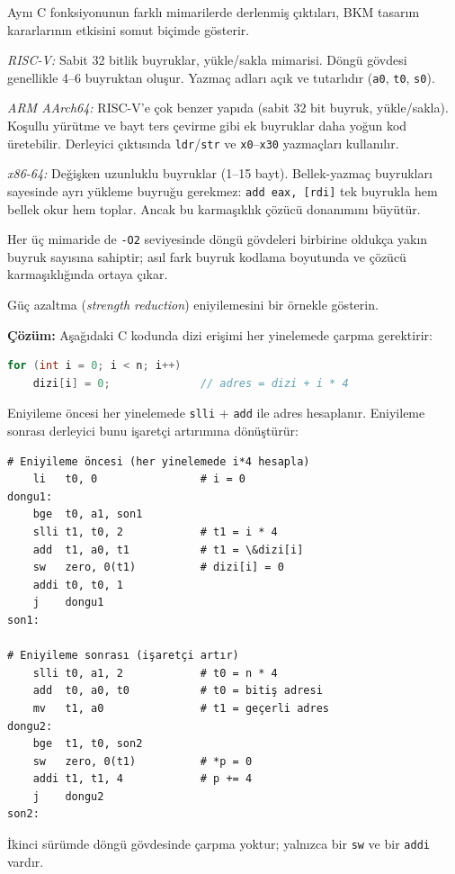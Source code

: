 \begin{karsilastirma}
Aynı C fonksiyonunun farklı mimarilerde derlenmiş çıktıları, BKM tasarım kararlarının etkisini somut biçimde gösterir.

\emph{RISC-V:} Sabit 32 bitlik buyruklar, yükle/sakla mimarisi. Döngü gövdesi genellikle 4--6 buyruktan oluşur. Yazmaç adları açık ve tutarlıdır (\texttt{a0}, \texttt{t0}, \texttt{s0}).

\emph{ARM AArch64:} RISC-V'e çok benzer yapıda (sabit 32 bit buyruk, yükle/sakla). Koşullu yürütme ve bayt ters çevirme gibi ek buyruklar daha yoğun kod üretebilir. Derleyici çıktısında \texttt{ldr}/\texttt{str} ve \texttt{x0}--\texttt{x30} yazmaçları kullanılır.

\emph{x86-64:} Değişken uzunluklu buyruklar (1--15 bayt). Bellek-yazmaç buyrukları sayesinde ayrı yükleme buyruğu gerekmez: \texttt{add eax, [rdi]} tek buyrukla hem bellek okur hem toplar. Ancak bu karmaşıklık çözücü donanımını büyütür.

Her üç mimaride de \texttt{-O2} seviyesinde döngü gövdeleri birbirine oldukça yakın buyruk sayısına sahiptir; asıl fark buyruk kodlama boyutunda ve çözücü karmaşıklığında ortaya çıkar.
\end{karsilastirma}

\begin{ornek}[4.17]
\label{orn:guc-azaltma}
Güç azaltma (\emph{strength reduction}) eniyilemesini bir örnekle gösterin.

\textbf{Çözüm:} Aşağıdaki C kodunda dizi erişimi her yinelemede çarpma gerektirir:

\begin{lstlisting}[language=C, style=alistirma-kod]
for (int i = 0; i < n; i++)
    dizi[i] = 0;              // adres = dizi + i * 4
\end{lstlisting}

Eniyileme öncesi her yinelemede \texttt{slli} + \texttt{add} ile adres hesaplanır. Eniyileme sonrası derleyici bunu işaretçi artırımına dönüştürür:

\begin{lstlisting}[style=riscv]
# Eniyileme öncesi (her yinelemede i*4 hesapla)
    li   t0, 0                # i = 0
dongu1:
    bge  t0, a1, son1
    slli t1, t0, 2            # t1 = i * 4
    add  t1, a0, t1           # t1 = \&dizi[i]
    sw   zero, 0(t1)          # dizi[i] = 0
    addi t0, t0, 1
    j    dongu1
son1:

# Eniyileme sonrası (işaretçi artır)
    slli t0, a1, 2            # t0 = n * 4
    add  t0, a0, t0           # t0 = bitiş adresi
    mv   t1, a0               # t1 = geçerli adres
dongu2:
    bge  t1, t0, son2
    sw   zero, 0(t1)          # *p = 0
    addi t1, t1, 4            # p += 4
    j    dongu2
son2:
\end{lstlisting}

İkinci sürümde döngü gövdesinde çarpma yoktur; yalnızca bir \texttt{sw} ve bir \texttt{addi} vardır.
\end{ornek}


